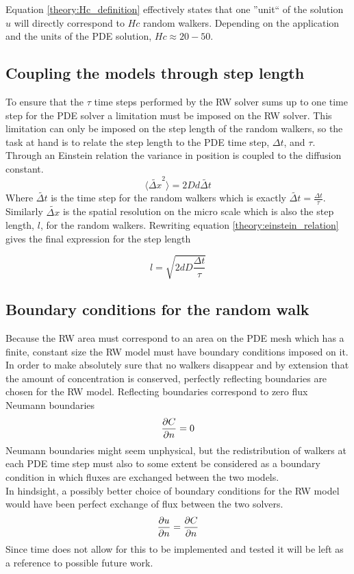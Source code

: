 Equation \eqref{theory:Hc_definition} effectively states that one ''unit`` of the solution $u$ will directly correspond to $Hc$ random walkers. Depending on the application and the units of the PDE solution, $Hc \approx 20-50$.

\subsection{Coupling the models through step length}

To ensure that the $\tau$ time steps performed by the RW solver sums up to one time step for the PDE solver a limitation must be imposed on the RW solver. 
This limitation can only be imposed on the step length of the random walkers, so the task at hand is to relate the step length to the PDE time step, $\Delta t$, and $\tau$. \\
Through an Einstein relation the variance in position is coupled to the diffusion constant.
\begin{equation}\label{theory:einstein_relation}
 \langle\tilde{\Delta x}^2\rangle = 2Dd\tilde{\Delta t}
\end{equation}
Where $\tilde{\Delta t}$ is the time step for the random walkers which is exactly $\tilde{\Delta t} = \frac{\Delta t}{\tau}$. 
Similarly $\tilde{\Delta x}$ is the spatial resolution on the micro scale which is also the step length, $l$, for the random walkers. 
Rewriting equation \eqref{theory:einstein_relation} gives the final expression for the step length

\begin{equation}\label{theory:step_length}
 l = \sqrt{2dD\frac{\Delta t}{\tau}}
\end{equation}

\subsection{Boundary conditions for the random walk}\label{theory:BC_RW}

Because the RW area must correspond to an area on the PDE mesh which has a finite, constant size the RW model must have boundary conditions imposed on it. 
In order to make absolutely sure that no walkers disappear and by extension that the amount of concentration is conserved, perfectly reflecting boundaries are chosen for the RW model. 
Reflecting boundaries correspond to zero flux Neumann boundaries
\begin{equation}
 \frac{\partial C}{\partial n} = 0
\end{equation}
Neumann boundaries might seem unphysical, but the redistribution of walkers at each PDE time step must also to some extent be considered as a boundary condition in which fluxes are exchanged between the two models. \\
In hindsight, a possibly better choice of boundary conditions for the RW model would have been perfect exchange of flux between the two solvers. 
\begin{equation}
 \frac{\partial u}{\partial n} = \frac{\partial C}{\partial n}
\end{equation}
Since time does not allow for this to be implemented and tested it will be left as a reference to possible future work.

